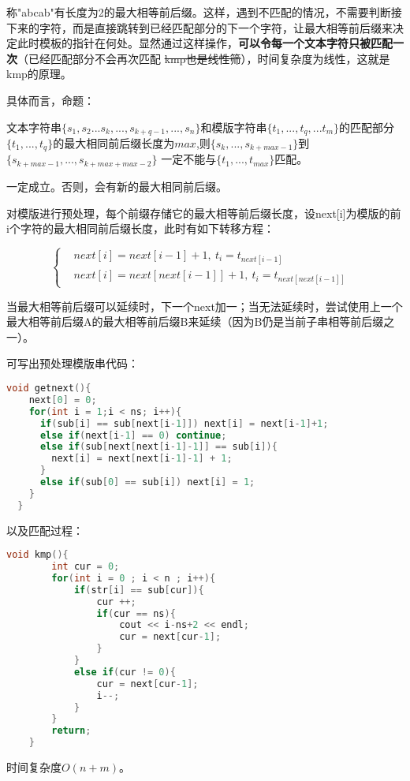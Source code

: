 \documentclass{article}
\begin{document}
	称"abcab"有长度为2的最大相等前后缀。这样，遇到不匹配的情况，不需要判断接下来的字符，而是直接跳转到已经匹配部分的下一个字符，让最大相等前后缀来决定此时模板的指针在何处。显然通过这样操作，\textbf{可以令每一个文本字符只被匹配一次}（已经匹配部分不会再次匹配 \sout{kmp也是线性筛}），时间复杂度为线性，这就是kmp的原理。

	具体而言，命题：

	文本字符串$\{s_1,s_2...s_k,...,s_{k+q-1},...,s_n\}$和模版字符串$\{t_1,...,t_q,...t_m\}$的匹配部分 
	$ \{t_1, ..., t_q\}$的最大相同前后缀长度为$max$,则$\{s_{k},...,s_{k+max-1}\}$到$\{s_{k+max-1},...,s_{k+max+max-2}\}$
	一定不能与$\{t_1,...,t_{max}\}$匹配。

	一定成立。否则，会有新的最大相同前后缀。

	对模版进行预处理，每个前缀存储它的最大相等前后缀长度，设next[i]为模版的前i个字符的最大相同前后缀长度，此时有如下转移方程：

\begin{equation}
	\left\{
		\begin{aligned}
			&next[i] = next[i-1]+1, \ t_i = t_{next[i-1]} &\\
			&next[i] = next[next[i-1]]+1, \ t_i = t_{next[next[i-1]]} &
		\end{aligned}
	\right.
\end{equation}

当最大相等前后缀可以延续时，下一个next加一；当无法延续时，尝试使用上一个最大相等前后缀A的最大相等前后缀B来延续（因为B仍是当前子串相等前后缀之一）。

可写出预处理模版串代码：

\begin{lstlisting}[language = C++]
void getnext(){
	next[0] = 0;
	for(int i = 1;i < ns; i++){
	  if(sub[i] == sub[next[i-1]]) next[i] = next[i-1]+1;
	  else if(next[i-1] == 0) continue;
	  else if(sub[next[next[i-1]-1]] == sub[i]){
		next[i] = next[next[i-1]-1] + 1;
	  }
	  else if(sub[0] == sub[i]) next[i] = 1;
	}
  }
\end{lstlisting}

以及匹配过程：

\begin{lstlisting}[language=C++]
	void kmp(){
		int cur = 0;
		for(int i = 0 ; i < n ; i++){
			if(str[i] == sub[cur]){
				cur ++;
				if(cur == ns){
					cout << i-ns+2 << endl;
					cur = next[cur-1];
				}
			}
			else if(cur != 0){
				cur = next[cur-1];
				i--;
			}
		}
		return;
	}
\end{lstlisting}

时间复杂度$O(n+m)$。
\end{document}

